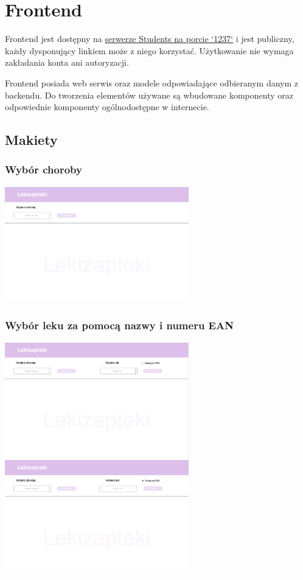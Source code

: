\documentclass{article}
\begin{document}
  \section{Frontend}
  Frontend jest dostępny na
  \href{http://students.mimuw.edu.pl:1237}{serwerze Students na porcie `1237`} i jest publiczny,
  każdy dysponujący linkiem może z niego korzystać.
  Użytkowanie nie wymaga zakładania konta ani autoryzacji.

  Frontend posiada web serwis oraz modele odpowiadające odbieranym danym z backendu.
  Do tworzenia elementów używane są wbudowane komponenty oraz odpowiednie komponenty ogólnodostępne w internecie.

    \subsection{Makiety}
      \subsubsection{Wybór choroby}
      \includegraphics[width=8cm]{images/lekizapteki-wybor-choroby}

      \subsubsection{Wybór leku za pomocą nazwy i numeru EAN}
      \includegraphics[width=8cm]{images/lekizapteki-wybor-leku-nazwa}
      \includegraphics[width=8cm]{images/lekizapteki-wybor-leku-ean}
\end{document}
